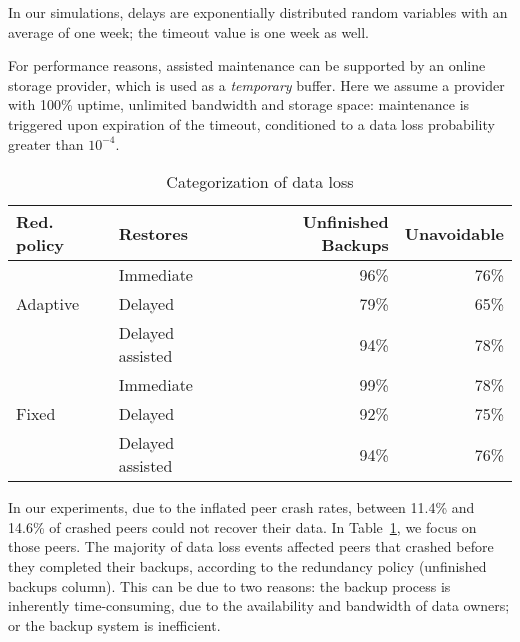 \documentclass[conference,10pt]{IEEEtran}
\begin{document}
In our simulations, delays are exponentially distributed random variables with an average of one week; the timeout value is one week as well.

For performance reasons, assisted maintenance can be supported by an online storage provider, which is used as a \emph{temporary} buffer. Here we assume a provider with 100\% uptime, unlimited bandwidth and storage space: maintenance is triggered upon expiration of the timeout, conditioned to a data loss probability greater than $10^{-4}$.


\begin{table}
\centering

\caption{Categorization of data loss}
\label{tab:dataloss}
\begin{tabular}{|l|l|r|r|}
\hline
Red. policy & Restores & Unfinished Backups & Unavoidable \\
\hline
\hline

& Immediate & 96\% & 76\% \\

\cline{2-4}

Adaptive & Delayed & 79\% & 65\% \\

\cline{2-4}

& Delayed assisted & 94\% & 78\% \\

\hline

& Immediate & 99\% & 78\% \\

\cline{2-4}

Fixed & Delayed & 92\% & 75\% \\

\cline{2-4}

& Delayed assisted & 94\% & 76\% \\

\hline
\end{tabular}
\end{table}

In our experiments, due to the inflated peer crash rates, between
11.4\% and 14.6\% of crashed peers could not recover their data. In
Table~\ref{tab:dataloss}, we focus on those peers. The majority of
data loss events affected peers that crashed before they completed
their backups, according to the redundancy policy (unfinished backups
column). This can be due to two reasons: the backup process is
inherently time-consuming, due to the availability and bandwidth of
data owners; or the backup system is inefficient.
\end{document}
